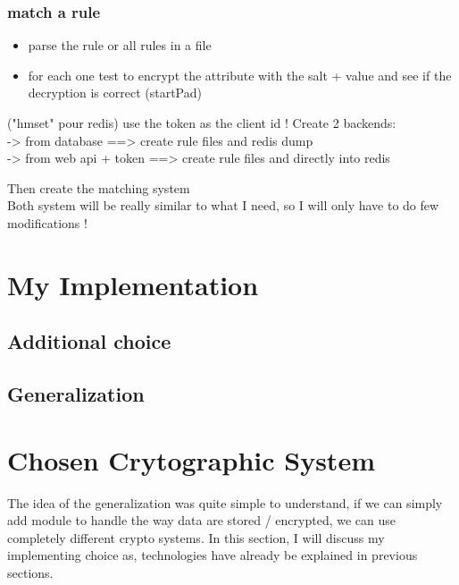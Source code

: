 \documentclass{eplmastersthesis}
\begin{document}
\subsubsection{match a rule}
\begin{itemize}
\item parse the rule or all rules in a file
\item for each one test to encrypt the attribute with the salt + value and see if the decryption is correct (startPad)
\end{itemize}

\info("hmset" pour redis)
use the token as the client id !
Create 2 backends:\\
-> from  database ==> create rule files and redis dump \\
-> from web api + token ==> create rule files and directly into redis \\



Then create the matching system\\

Both system will be really similar to what I need, so I will only have to do few modifications !
\section{My Implementation}

\subsection{\cite{van2016private}}

\subsection{Additional choice}

\subsection{Generalization}

\section{Chosen Crytographic System}
The idea of the generalization was quite simple to understand, if we can simply add module to handle the way data are stored / encrypted, we can use completely different crypto systems. In this section, I will discuss my implementing choice as, technologies have already be explained in previous sections.
\end{document}
